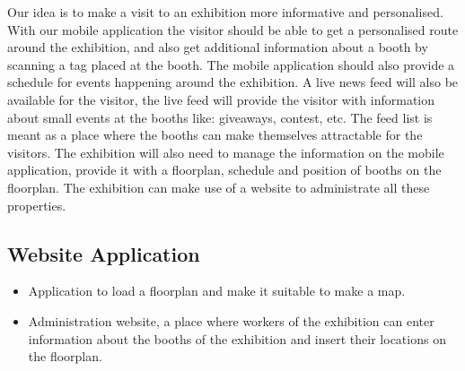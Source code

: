Our idea is to make a visit to an exhibition more informative and personalised.  With our mobile application the visitor should be able to get a personalised  route around the exhibition, and also get additional information about a booth by scanning a tag placed at the booth. The mobile application should also provide a schedule for events happening around the exhibition. A live news feed will also be available for the visitor, the live feed will provide the visitor with information about small events at the booths like: giveaways, contest, etc. The feed list is meant as a place where the booths can make themselves attractable for the visitors.
The exhibition will also need to manage the information on the mobile application, provide it with a floorplan, schedule and position of booths on the floorplan. The exhibition can make use of a website to administrate all these properties.
\subsection*{Website Application}
\begin{itemize}
\item Application to load a floorplan and make it suitable to make a map.
\item Administration website, a place where workers of the exhibition can enter information about the booths of the exhibition and insert their locations on the floorplan.
\end{itemize}
